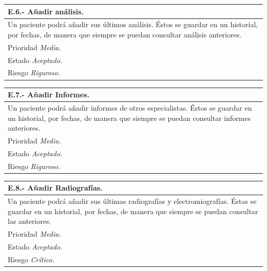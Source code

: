 \documentclass[a4paper,oneside,11pt]{book}
\begin{document}
\begin{center}
\begin{tabulary}{15cm}{|L|}
	\hline
		\bf{E.6.- Añadir análisis.} \\
	\hline
		Un paciente podrá añadir sus últimos análisis. Éstos se guardar en un historial, por fechas, de manera que siempre se puedan consultar análisis anteriores. \\
	\hline
		Prioridad \textit{Media.} \\
	\hline
		Estado \textit{Aceptado.} \\
	\hline
		Riesgo \textit{Riguroso.} \\
	\hline
\end{tabulary}
\end{center}

\begin{center}
\begin{tabulary}{15cm}{|L|}
	\hline
		\bf{E.7.- Añadir Informes.} \\
	\hline
		Un paciente podrá añadir informes de otros especialistas. Éstos se guardar en un historial, por fechas, de manera que siempre se puedan consultar informes anteriores. \\
	\hline
		Prioridad \textit{Media.} \\
	\hline
		Estado \textit{Aceptado.} \\
	\hline
		Riesgo \textit{Riguroso.} \\
	\hline
\end{tabulary}
\end{center}

\begin{center}
\begin{tabulary}{15cm}{|L|}
	\hline
		\bf{E.8.- Añadir Radiografías.} \\
	\hline
		Un paciente podrá añadir sus últimas radiografías y electromiografías. Éstas se guardar en un historial, por fechas, de manera que siempre se puedan consultar las anteriores. \\
	\hline
		Prioridad \textit{Media.} \\
	\hline
		Estado \textit{Aceptado.} \\
	\hline
		Riesgo \textit{Crítico.} \\
	\hline
\end{tabulary}
\end{center}
\end{document}
